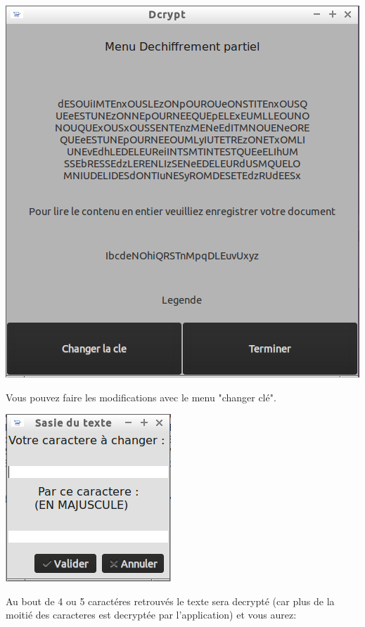 \documentclass[a4]{article}
\begin{document}
			\begin{center}\includegraphics[scale=0.4]{13.png}\end{center}
			Vous pouvez faire les modifications avec le menu "changer clé". 							\begin{center}\includegraphics[scale=0.4]{23.png}\end{center}
			Au bout de 4 ou 5 caractéres retrouvés le texte sera decrypté (car plus de la moitié 
			des caracteres est decryptée par l'application) et vous aurez:
\end{document}
